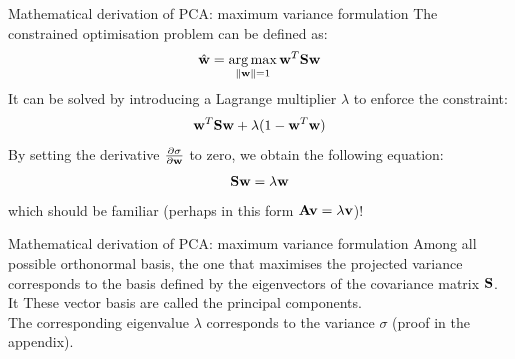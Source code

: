 \documentclass[aspectratio=169,notes]{beamer}
\begin{document}
	\begin{frame}{Mathematical derivation of PCA: maximum variance formulation}
	The constrained optimisation problem can be defined as:
	\[
		\hat{{\bf w}} = \operatorname*{arg\,max}_{\|{\bf w}\|=1} {\bf w}^T {\bf S} {\bf w}
	\]
	It can be solved by introducing a Lagrange multiplier $\lambda$ to enforce the constraint:
	\[
		{\bf w}^T {\bf S} {\bf w} + \lambda (1-{\bf w}^T{\bf w})
	\]
	By setting the derivative $\frac{\partial \sigma}{\partial {\bf w}}$ to zero, we obtain the following equation:
	\[
		{\bf S} {\bf w} = \lambda {\bf w}
	\]
	which should be familiar (perhaps in this form ${\bf A} {\bf v} = \lambda {\bf v}$)!
	\end{frame}

	\begin{frame}{Mathematical derivation of PCA: maximum variance formulation}
	Among all possible orthonormal basis, the one that maximises the projected variance corresponds to the basis defined by the eigenvectors of the covariance matrix ${\bf S}$. It These vector basis are called the principal components.\\
	\leavevmode\newline
	The corresponding eigenvalue $\lambda$ corresponds to the variance $\sigma$ (proof in the appendix).
	\end{frame}


\end{document}
